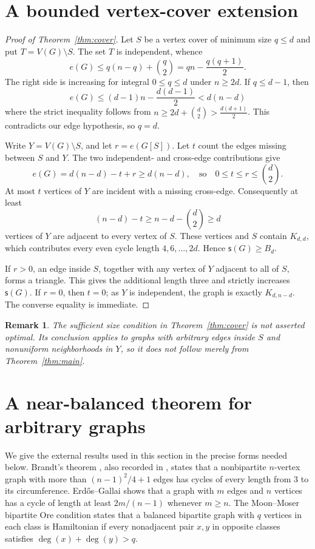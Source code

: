 \documentclass[11pt,letterpaper]{article}
\newtheorem{remark}[theorem]{Remark}
\newcommand{\hc}{\mathsf{s}}
\newcommand{\edges}{e}
\begin{document}
\section{A bounded vertex-cover extension}
\begin{proof}[Proof of Theorem~\ref{thm:cover}]
Let $S$ be a vertex cover of minimum size $q\le d$ and put
$T=V(G)\setminus S$.  The set $T$ is independent, whence
\begin{equation}\label{eq:cover-upper}
\edges(G)\le q(n-q)+\binom q2
=qn-\frac{q(q+1)}2.
\end{equation}
The right side is increasing for integral $0\le q\le d$ under
$n\ge2d$.  If $q\le d-1$, then
\[
\edges(G)\le(d-1)n-\frac{d(d-1)}2< d(n-d)
\]
where the strict inequality follows from
$n\ge2d+\binom d2>\frac{d(d+1)}2$.
This contradicts our edge hypothesis, so $q=d$.

Write $Y=V(G)\setminus S$, and let $r=\edges(G[S])$.
Let $t$ count the edges missing between $S$ and $Y$.
The two independent- and cross-edge contributions give
\[
\edges(G)=d(n-d)-t+r\ge d(n-d),
\quad\text{so}\quad 0\le t\le r\le\binom d2.
\]
At most $t$ vertices of $Y$ are incident with a missing
cross-edge.  Consequently at least
\[
(n-d)-t\ge n-d-\binom d2\ge d
\]
vertices of $Y$ are adjacent to every vertex of $S$.
These vertices and $S$ contain $K_{d,d}$, which contributes
every even cycle length $4,6,\ldots,2d$.  Hence $\hc(G)\ge B_d$.

If $r>0$, an edge inside $S$, together with any vertex of $Y$
adjacent to all of $S$, forms a triangle.  This gives the
additional length three and strictly increases $\hc(G)$.
If $r=0$, then $t=0$; as $Y$ is independent, the graph is
exactly $K_{d,n-d}$.  The converse equality is immediate.
\end{proof}

\begin{remark}
The sufficient size condition in Theorem~\ref{thm:cover} is not
asserted optimal.  Its conclusion applies to graphs with arbitrary
edges inside $S$ and nonuniform neighborhoods in $Y$, so it does
not follow merely from Theorem~\ref{thm:main}.
\end{remark}

\section{A near-balanced theorem for arbitrary graphs}
We give the external results used in this section in the precise
forms needed below.  Brandt's theorem \cite{Brandt}, also recorded
in \cite[Theorem 2.5]{MMPS}, states that a nonbipartite $n$-vertex
graph with more than $(n-1)^2/4+1$ edges has cycles of every length
from 3 to its circumference.  Erd\H{o}s--Gallai \cite{EG}
shows that a graph with $m$ edges and $n$ vertices has a cycle
of length at least $2m/(n-1)$ whenever $m\ge n$.
The Moon--Moser bipartite Ore condition \cite[Corollary 3]{MoonMoser}
states that a balanced bipartite graph with $q$ vertices in each class
is Hamiltonian if every nonadjacent pair $x,y$ in opposite classes
satisfies $\deg(x)+\deg(y)>q$.
\end{document}
